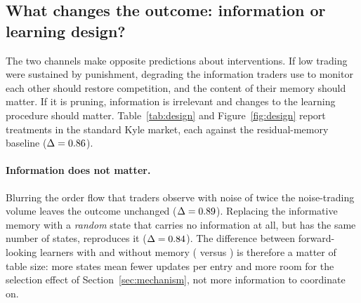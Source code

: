 \subsection{What changes the outcome: information or learning design?}
\label{sec:design}

The two channels make opposite predictions about interventions. If low trading
were sustained by punishment, degrading the information traders use to
monitor each other should restore competition, and the content of their memory
should matter. If it is pruning, information is irrelevant and changes to the
learning procedure should matter. Table~\ref{tab:design} and
Figure~\ref{fig:design} report treatments in the standard Kyle market, each
against the residual-memory baseline ($\Delta=0.86$).

\paragraph{Information does not matter.} Blurring the order flow that traders
observe with noise of twice the noise-trading volume leaves the outcome
unchanged ($\Delta=0.89$). Replacing the informative memory with a
\emph{random} state that carries no information at all, but has the same
number of states, reproduces it ($\Delta=0.84$). The difference
between forward-looking learners with and without memory
(\ResidDeltaInt{} versus \NoneDeltaInt{}) is therefore a matter of table size:
more states mean fewer updates per entry and more room for the selection effect
of Section~\ref{sec:mechanism}, not more information to coordinate on.

